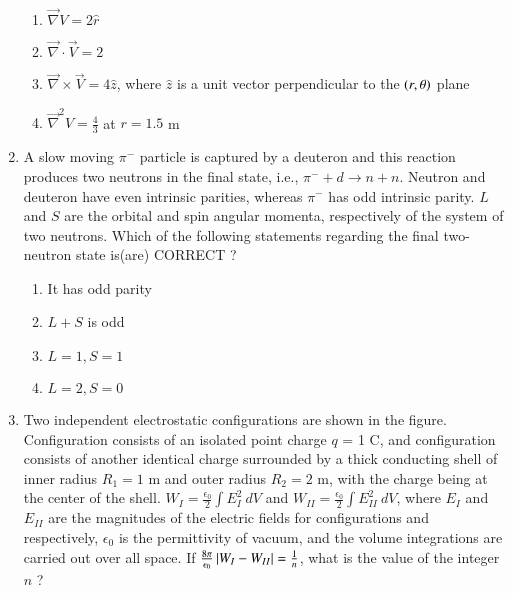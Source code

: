 \documentclass[journal]{IEEEtran}
\begin{document}
\begin{enumerate}
\begin{align*}
\end{align*}
\begin{enumerate}
    \item $\overrightarrow{\nabla}V = 2\hat{r}$
    \item $\overrightarrow{\nabla}\cdot\overrightarrow{V} = 2$
    \item $\overrightarrow{\nabla}\times\overrightarrow{V} = 4\hat{z}$, where $\hat{z}$ is a unit vector perpendicular to the $\left(r, \theta\right)$ plane
    \item $\overrightarrow{\nabla}^2V = \frac{4}{3}$ at $r = 1.5$ m \\
\end{enumerate}
\item A slow moving $\pi^{-}$ particle is captured by a deuteron  and this reaction produces two neutrons  in the final state, i.e., $\pi^{-} + d \rightarrow n + n$. Neutron and deuteron have even intrinsic parities, whereas $\pi^{-}$ has odd intrinsic parity. $L$ and $S$ are the orbital and spin angular momenta, respectively of the system of two neutrons. Which of the following statements regarding the final two-neutron state is(are) CORRECT ? 
\begin{enumerate}
    \item It has odd parity
    \item $L + S$ is odd
    \item $L = 1, S = 1$
    \item $L = 2, S = 0$ \\ 
\end{enumerate}
\item Two independent electrostatic configurations are shown in the figure.
Configuration  consists of an isolated point charge $q$ = 1 C, and configuration  consists of another identical charge surrounded by a thick conducting shell of inner radius $R_1 = 1$ m and outer radius $R_2 = 2$ m, with the charge being at the center of the shell. $W_{I} = \frac{\epsilon_0}{2}\int E_{I}^2\ dV$ and $W_{II} = \frac{\epsilon_0}{2}\int E_{II}^2\ dV$, where $E_{I}$ and $E_{II}$ are the magnitudes of the electric fields for configurations  and  respectively, $\epsilon_0$ is the permittivity of vacuum, and the volume integrations are carried out over all space. If $\frac{8\pi}{\epsilon_0}\left\vert W_{I} - W_{II}\right\vert = \frac{1}{n}$, what is
the value of the integer $n$ ?
\begin{figure}[!ht]
\centering
\resizebox{0.5\textwidth}{!}{%

}%
\end{figure} \\

\end{enumerate}
\end{document}
